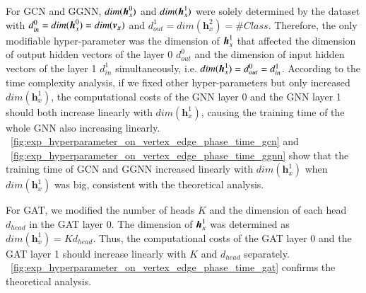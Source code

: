 

For GCN and GGNN, $dim(\boldsymbol{h}^0_x)$ and $dim(\boldsymbol{h}^1_x)$ were solely determined by the dataset with $d^0_{in} = dim(\boldsymbol{h}^0_x) = dim(\boldsymbol{v_x})$ and $d^1_{out} = dim(\boldsymbol{h}^2_x)=\#Class$.
%
Therefore, the only modifiable hyper-parameter was the dimension of $\boldsymbol{h}^1_x$ that affected the dimension of output hidden vectors of the layer 0 $d^0_{out}$ and the dimension of input hidden vectors of the layer 1 $d^1_{in}$ simultaneously, i.e. $dim(\boldsymbol{h}^1_x)  = d^0_{out} = d^1_{in}$.
%
According to the time complexity analysis, if we fixed other hyper-parameters but only increased $dim(\boldsymbol{h}^1_x)$, the computational costs of the GNN layer 0 and the GNN layer 1 should both increase linearly with $dim(\boldsymbol{h}^1_x)$, causing the training time of the whole GNN also increasing linearly. 
%
\figurename~\ref{fig:exp_hyperparameter_on_vertex_edge_phase_time_gcn} and \figurename~\ref{fig:exp_hyperparameter_on_vertex_edge_phase_time_ggnn} show that the training time of GCN and GGNN increased linearly with $dim(\boldsymbol{h}^1_x)$ when $dim(\boldsymbol{h}^1_x)$ was big, consistent with the theoretical analysis.

For GAT, we modified the number of heads $K$ and the dimension of each head $d_{head}$ in the GAT layer 0.
%
The dimension of $\boldsymbol{h}^1_x$ was determined as $dim(\boldsymbol{h}^1_x) = K d_{head}$.
%
Thus, the computational costs of the GAT layer 0 and the GAT layer 1 should increase linearly with $K$ and $d_{head}$ separately. 
%
\figurename~\ref{fig:exp_hyperparameter_on_vertex_edge_phase_time_gat} confirms the theoretical analysis.


